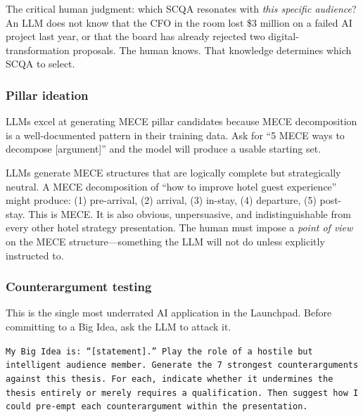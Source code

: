 The critical human judgment: which SCQA resonates with \emph{this specific audience}? An LLM does not know that the CFO in the room lost \$3 million on a failed AI project last year, or that the board has already rejected two digital-transformation proposals. The human knows. That knowledge determines which SCQA to select.

\subsubsection{Pillar ideation}

LLMs excel at generating MECE pillar candidates because MECE decomposition is a well-documented pattern in their training data. Ask for ``5 MECE ways to decompose [argument]'' and the model will produce a usable starting set.

\begin{alertbox}
LLMs generate MECE structures that are logically complete but strategically neutral. A MECE decomposition of ``how to improve hotel guest experience'' might produce: (1) pre-arrival, (2) arrival, (3) in-stay, (4) departure, (5) post-stay. This is MECE. It is also obvious, unpersuasive, and indistinguishable from every other hotel strategy presentation. The human must impose a \emph{point of view} on the MECE structure---something the LLM will not do unless explicitly instructed to.
\end{alertbox}

\subsubsection{Counterargument testing}

This is the single most underrated AI application in the Launchpad. Before committing to a Big Idea, ask the LLM to attack it.

\begin{keybox}
\texttt{My Big Idea is: ``[statement].'' Play the role of a hostile but intelligent audience member. Generate the 7 strongest counterarguments against this thesis. For each, indicate whether it undermines the thesis entirely or merely requires a qualification. Then suggest how I could pre-empt each counterargument within the presentation.}
\end{keybox}

